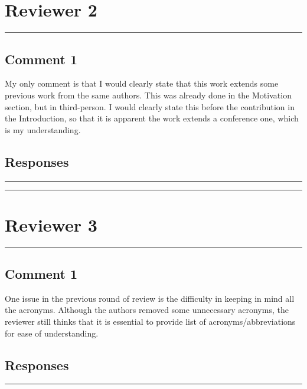 \documentclass[10pt,journal, compsoc]{IEEEtran}
\begin{document}
\vspace{10em}


\section*{Reviewer 2}

\noindent\rule[0.25\baselineskip]{252pt}{1pt}

\subsection*{Comment 1}
My only comment is that I would clearly state that this work extends some previous work from the same authors. This was already done in the Motivation section, but in third-person. I would clearly state this before the contribution in the Introduction, so that it is apparent the work extends a conference one, which is my understanding.

\subsection*{Responses}



\noindent\rule[0.25\baselineskip]{252pt}{1pt}
\noindent\rule[0.25\baselineskip]{252pt}{1pt}

\vspace{10em}

\section*{Reviewer 3}

\noindent\rule[0.25\baselineskip]{252pt}{1pt}

\subsection*{Comment 1}
One issue in the previous round of review is the difficulty in keeping in mind all the acronyms. Although the authors removed some unnecessary acronyms, the reviewer still thinks that it is essential to provide list of acronyms/abbreviations for ease of understanding.

\subsection*{Responses}



\noindent\rule[0.25\baselineskip]{252pt}{1pt}
\end{document}
